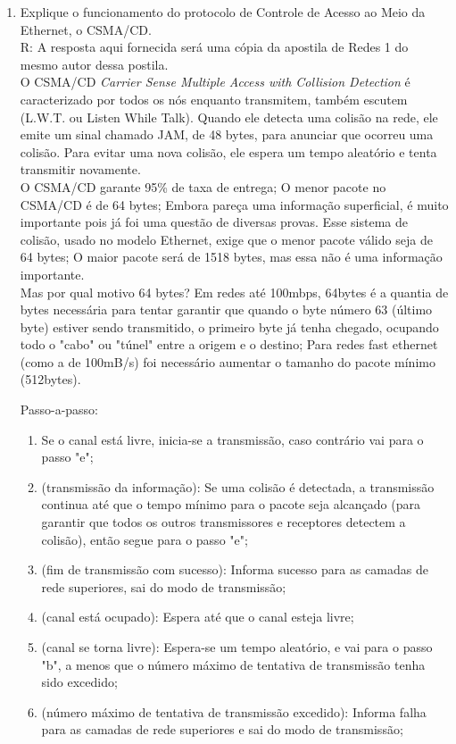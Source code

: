 \documentclass{article}
\begin{document}
\begin{enumerate}
 	\item Explique o funcionamento do protocolo de Controle de Acesso ao Meio da Ethernet, o CSMA/CD.
	\\R: A resposta aqui fornecida será uma cópia da apostila de Redes 1 do mesmo autor dessa
postila.\\
O CSMA/CD \textit{Carrier Sense Multiple Access with Collision Detection} é
caracterizado por todos os nós enquanto transmitem, também escutem (L.W.T. ou
Listen While Talk). Quando ele detecta uma colisão na rede, ele emite um sinal
chamado JAM, de 48 bytes, para anunciar que ocorreu uma colisão. Para evitar uma
nova colisão, ele espera um tempo aleatório e tenta transmitir novamente.\\
O CSMA/CD garante 95\% de taxa de entrega; O menor pacote no CSMA/CD é de 64
bytes; Embora pareça uma informação superficial, é muito importante pois já foi
uma questão de diversas provas. Esse sistema de colisão, usado no modelo
Ethernet, exige que o menor pacote válido seja de 64 bytes; O maior pacote será
de 1518 bytes, mas essa não é uma informação importante.\\
Mas por qual motivo 64 bytes? Em redes até 100mbps, 64bytes é a quantia de bytes
necessária para tentar garantir que quando o byte número 63 (último byte) estiver sendo
transmitido, o primeiro byte já tenha chegado, ocupando todo o "cabo" ou "túnel"
entre a origem e o destino; Para redes fast ethernet (como a de 100mB/s) foi
necessário aumentar o tamanho do pacote mínimo (512bytes).

Passo-a-passo:

\begin{enumerate}
        \item Se o canal está livre, inicia-se a transmissão, caso contrário vai para o passo "e";
        \item (transmissão da informação): Se uma colisão é detectada, a
transmissão continua até que o tempo mínimo para o pacote seja alcançado (para
garantir que todos os outros transmissores e receptores detectem a colisão),
então segue para o passo "e";
        \item (fim de transmissão com sucesso): Informa sucesso para as camadas de rede superiores,
sai do modo de transmissão;
        \item (canal está ocupado): Espera até que o canal esteja livre;
        \item (canal se torna livre): Espera-se um tempo aleatório, e vai para o passo "b", a  menos
que o número máximo de tentativa de transmissão tenha sido excedido;
        \item (número máximo de tentativa de transmissão excedido): Informa
falha para as camadas de rede superiores e sai do modo de transmissão;


\end{enumerate}
\end{enumerate}
\end{document}

